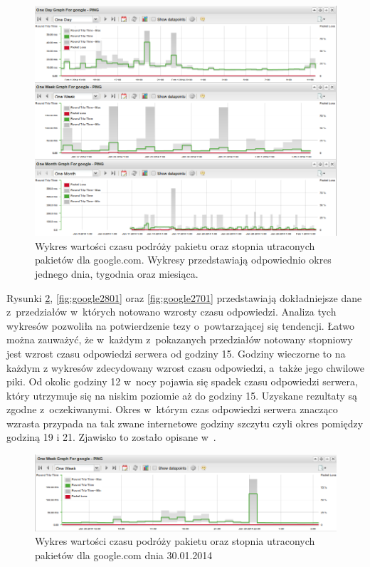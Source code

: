 \begin{figure}[ht]
  \caption{Wykres wartości czasu podróży pakietu oraz stopnia
    utraconych pakietów dla google.com.  Wykresy przedstawiają
    odpowiednio okres jednego dnia, tygodnia oraz miesiąca.}
  \label{fig:pingiGoogle}
  \centering
\includegraphics[width=1\textwidth]{img/pingiGoogle.png}
\end{figure}


Rysunki \ref{fig:google3001}, \ref{fig:google2801} oraz
\ref{fig:google2701} przedstawiają dokładniejsze dane z~przedziałów
w~których notowano wzrosty czasu odpowiedzi. Analiza tych wykresów
pozwoliła na potwierdzenie tezy o~powtarzającej się tendencji. Łatwo
można zauważyć, że w~każdym z~pokazanych przedziałów notowany
stopniowy jest wzrost czasu odpowiedzi serwera od godziny 15. Godziny
wieczorne to na każdym z wykresów zdecydowany wzrost czasu odpowiedzi,
a~także jego chwilowe piki. Od okolic godziny 12 w~nocy pojawia się
spadek czasu odpowiedzi serwera, który utrzymuje się na niskim
poziomie aż do godziny 15. Uzyskane rezultaty są zgodne
z~oczekiwanymi. Okres w~którym czas odpowiedzi serwera znacząco
wzrasta przypada na tak zwane internetowe godziny szczytu czyli okres
pomiędzy godziną 19 i 21. Zjawisko to zostało opisane
w~\cite{www:RushHours}.


\begin{figure}[H]
  \caption{Wykres wartości czasu podróży pakietu oraz stopnia
    utraconych pakietów dla google.com dnia 30.01.2014}
  \label{fig:google3001}
  \centering
\includegraphics[width=1\textwidth]{img/google3001.png}
\end{figure}

